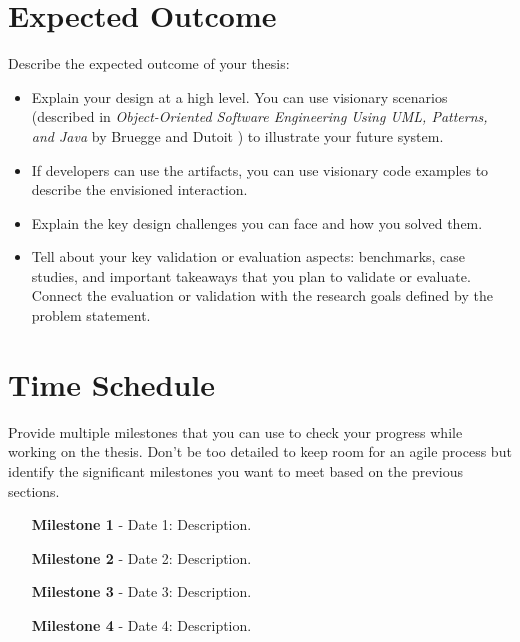 \section*{Expected Outcome}

\begin{tcolorbox}
	Describe the expected outcome of your thesis:
	\begin{itemize}
		\item Explain your design at a high level. You can use visionary scenarios (described in \textit{Object-Oriented Software Engineering Using UML, Patterns, and Java} by Bruegge and Dutoit \cite{bruegge2013object}) to illustrate your future system. 
		\item If developers can use the artifacts, you can use visionary code examples to describe the envisioned interaction.
		\item Explain the key design challenges you can face and how you solved them.
		\item Tell about your key validation or evaluation aspects: benchmarks, case studies, and important takeaways that you plan to validate or evaluate. Connect the evaluation or validation with the research goals defined by the problem statement.
	\end{itemize}
\end{tcolorbox}

\section*{Time Schedule}

\begin{tcolorbox}
	Provide multiple milestones that you can use to check your progress while working on the thesis.
	Don't be too detailed to keep room for an agile process but identify the significant milestones you want to meet based on the previous sections.
\end{tcolorbox}

\begin{itemize}[itemindent=-13pt, leftmargin=43pt, align=left]
    \item[\textbf{Milestone 1} - Date 1:] Description.
    \item[\textbf{Milestone 2} - Date 2:] Description.
    \item[\textbf{Milestone 3} - Date 3:] Description.
    \item[\textbf{Milestone 4} - Date 4:] Description.
\end{itemize}


\backmatter









